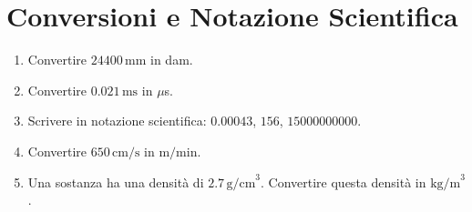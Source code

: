 \documentclass[12pt]{article}
\begin{document}
\section{Conversioni e Notazione Scientifica}

    \begin{enumerate}[label=\alph*)]
        \item Convertire $24400 \, \text{mm}$ in dam.
        \item Convertire $0.021 \, \text{ms}$ in $\mu$s.
        \item Scrivere in notazione scientifica: $0.00043$, $156$, $15000000000$.
        \item Convertire $650 \, \text{cm/s}$ in $\text{m/min}$.
        \item Una sostanza ha una densità di $2.7 \, \text{g/cm}^3$. Convertire questa densità in $\text{kg/m}^3$.
    \end{enumerate}
\end{document}

